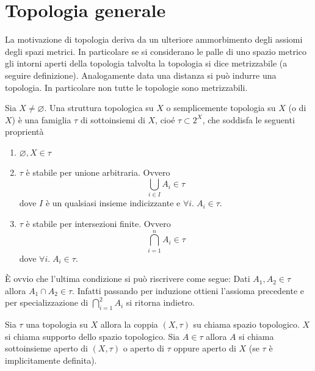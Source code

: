 \chapter{Topologia generale}
La motivazione di topologia deriva da un ulteriore ammorbimento degli assiomi degli spazi metrici. In particolare se si considerano le palle di uno spazio metrico gli intorni aperti della topologia talvolta la topologia si dice metrizzabile (a seguire definizione). Analogamente data una distanza si può indurre una topologia. In particolare non tutte le topologie sono metrizzabili. 

\begin{definition}
	Sia $X \neq \varnothing$. Una struttura topologica su $X$ o semplicemente topologia su $X$ (o di $X$) è una famiglia $\tau$ di sottoinsiemi di $X$, cioé $\tau \subset 2^X$, che soddisfa le seguenti proprientà
	\begin{enumerate}
		\item $\varnothing, X \in \tau$
		\item $\tau$ è stabile per unione arbitraria. Ovvero 
		\begin{equation}
			\bigcup_{i \in I} A_i \in \tau 	
		\end{equation}
		dove $I$ è un qualsiasi insieme indicizzante e $\forall i. \; A_i \in \tau$.
		\item $\tau$ è stabile per intersezioni finite. Ovvero 
		\begin{equation}
			\bigcap^n_{i=1} A_i \in \tau
		\end{equation}
		dove $\forall i. \; A_i \in \tau$.
	\end{enumerate} 
\end{definition}

\begin{remark}
	È ovvio che l'ultima condizione si può riscrivere come segue: Dati $A_1, A_2 \in \tau$ allora $A_1 \cap A_2 \in \tau$. Infatti passando per induzione ottieni l'assioma precedente e per specializzazione di $\bigcap^2_{i=1} A_i$ si ritorna indietro. 
\end{remark}

\begin{definition}
	Sia $\tau$ una topologia su $X$ allora la coppia $(X, \tau)$ su chiama spazio topologico. $X$ si chiama supporto dello spazio topologico. Sia $A \in \tau$ allora $A$ si chiama sottoinsieme aperto di $(X,\tau)$ o aperto di $\tau$ oppure aperto di $X$ (se $\tau$ è implicitamente definita). 	
\end{definition}


